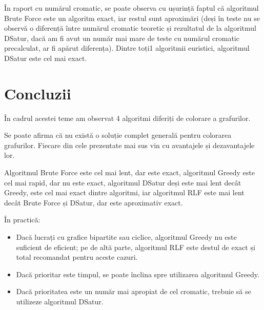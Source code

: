 \documentclass[runningheads]{paper}
\begin{document}
În raport cu numărul cromatic, se poate observa cu ușurință faptul că algoritmul
Brute Force este un algoritm exact, iar restul sunt aproximări (deși în teste 
nu se observă o diferență între numărul cromatic teoretic și rezultatul de la algoritmul DSatur, dacă
am fi avut un număr mai mare de teste cu numărul cromatic precalculat, ar fi apărut diferența).
Dintre toți1 algoritmii euristici, algoritmul DSatur este cel mai exact.

\section{Concluzii}
În cadrul acestei teme am observat 4 algoritmi diferiți de colorare a grafurilor.

Se poate afirma că nu există o soluție complet generală pentru colorarea grafurilor.
Fiecare din cele prezentate mai sus vin cu avantajele și dezavantajele lor.

Algoritmul Brute Force este cel mai lent, dar este exact, algoritmul Greedy este
cel mai rapid, dar nu este exact, algoritmul DSatur deși este mai lent decât Greedy,
este cel mai exact dintre algoritmi, iar algoritmul RLF este mai lent decât Brute Force și 
DSatur, dar este aproximativ exact.

În practică:
\begin{itemize}
    \item Dacă lucrați cu grafice bipartite sau ciclice, algoritmul Greedy nu este
    suficient de eficient; pe de altă parte, algoritmul RLF este destul de exact și total
    recomandat pentru aceste cazuri.
    \item Dacă prioritar este timpul, se poate înclina spre utilizarea algoritmul Greedy.
    \item Dacă prioritatea este un număr mai apropiat de cel cromatic, trebuie
    să se utilizeze algoritmul DSatur.

\end{itemize}
\pagebreak
\end{document}
